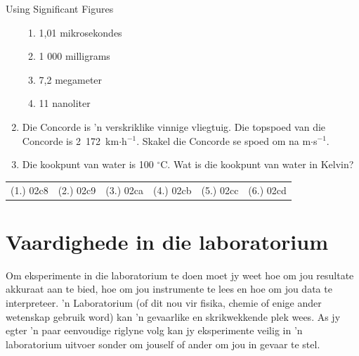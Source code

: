 \begin{exercises}{Using Significant Figures }
\begin{enumerate}[noitemsep, label=\textbf{\arabic*}. ]
  \begin{enumerate}[noitemsep, label=\textbf{\alph*}. ] 
  \item 1,01 mikrosekondes
  \item 1 000 milligrams
  \item 7,2 megameter
  \item 11 nanoliter
  \end{enumerate}
  \item Die Concorde is  'n verskriklike vinnige vliegtuig. Die topspoed van die Concorde is 2~172~km$\ensuremath{\cdot}$h${}^{-1}$. Skakel die Concorde se spoed om na m$\ensuremath{\cdot}$s${}^{-1}$.        
  \item Die kookpunt van water is 100 ${}^{\circ }$C. Wat is die kookpunt van water in Kelvin? 
\end{enumerate}
\par \practiceinfo
 \par \begin{tabular}[h]{cccccc}
  (1.) 02c8  &  (2.) 02c9  &  (3.) 02ca  &  (4.) 02cb  &  (5.) 02cc  &  (6.) 02cd \end{tabular}
\end{exercises}

\section{Vaardighede in die laboratorium}
Om eksperimente in die laboratorium te doen moet jy weet hoe om jou resultate akkuraat aan te bied, hoe om jou instrumente te lees en hoe om jou data te interpreteer.  'n Laboratorium (of dit nou vir fisika, chemie of enige ander wetenskap gebruik word) kan  'n gevaarlike en skrikwekkende plek wees. As jy egter  'n paar eenvoudige riglyne volg kan jy eksperimente veilig in  'n laboratorium uitvoer sonder om jouself of ander om jou in gevaar te stel.
